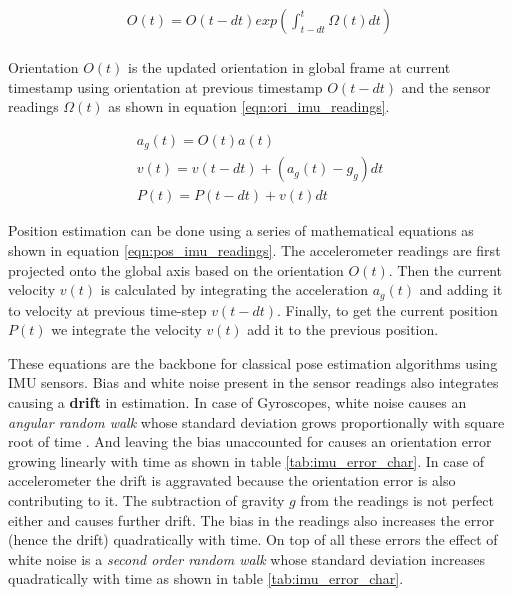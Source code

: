 \begin{equation}
  \label{eqn:ori_imu_readings}
  \begin{aligned}
    O(t) = O(t - dt) exp(\int_{t-dt}^{t} \Omega(t) dt) \\
  \end{aligned}
\end{equation}

 Orientation $ O(t) $ is the updated orientation in global frame at current timestamp using orientation at previous timestamp $ O(t - dt) $  and the sensor readings $ \Omega(t) $ as shown in equation \ref{eqn:ori_imu_readings}.

\begin{equation}
  \label{eqn:pos_imu_readings}
  \begin{gathered}
    a_g(t) = O(t)a(t) \\
    v(t) = v(t-dt) + (a_g(t) - g_g)dt \\
    P(t) = P(t-dt) + v(t)dt
  \end{gathered}
\end{equation}

 Position estimation can be done using a series of mathematical equations as shown in equation \ref{eqn:pos_imu_readings}. The accelerometer readings are first projected onto the global axis based on the orientation $ O(t) $. Then the current velocity $ v(t) $ is calculated by integrating the acceleration $ a_g(t) $ and adding it to velocity at previous time-step $ v(t-dt) $. Finally, to get the current position $ P(t) $ we integrate the velocity $ v(t) $ add it to the previous position. 

These equations are the backbone for classical pose estimation algorithms using IMU sensors. Bias and white noise present in the sensor readings also integrates causing a \textbf{drift} in estimation. In case of Gyroscopes, white noise causes an \textit{angular random walk} whose standard deviation grows proportionally with square root of time \citep{woodman2007introduction}. And leaving the bias unaccounted for causes an orientation error growing linearly with time as shown in table  \ref{tab:imu_error_char}. In case of accelerometer the drift is aggravated because the orientation error is also contributing to it. The subtraction of gravity $ g $ from the readings is not perfect either and causes further drift. The bias in the readings also increases the error (hence the drift) quadratically with time. On top of all these errors the effect of white noise  is a \textit{second order random walk} whose standard deviation increases quadratically with time as shown in table \ref{tab:imu_error_char}.

